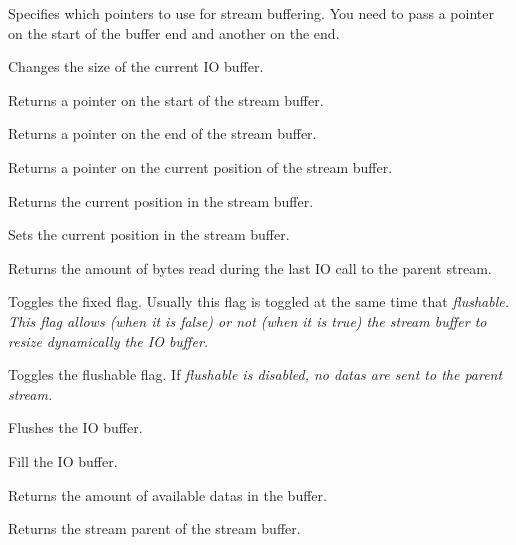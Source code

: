 Specifies which pointers to use for stream buffering. You need to pass a pointer on the
start of the buffer end and another on the end.


Changes the size of the current IO buffer.


Returns a pointer on the start of the stream buffer.


Returns a pointer on the end of the stream buffer.


Returns a pointer on the current position of the stream buffer.


Returns the current position in the stream buffer.


Sets the current position in the stream buffer.


Returns the amount of bytes read during the last IO call to the parent stream.


Toggles the fixed flag. Usually this flag is toggled at the same time that
\it{flushable}. This flag allows (when it is false) or not (when it is true)
the stream buffer to resize dynamically the IO buffer.


Toggles the flushable flag. If \it{flushable} is disabled, no datas are sent
to the parent stream.


Flushes the IO buffer.


Fill the IO buffer.


Returns the amount of available datas in the buffer.



Returns the stream parent of the stream buffer.
